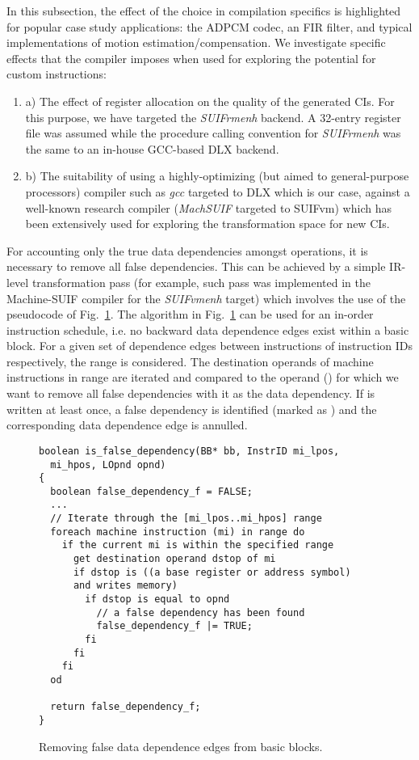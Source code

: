 \documentclass{comjnl}
\begin{document}
In this subsection, the effect of the choice in compilation specifics is highlighted for popular case study applications: the ADPCM codec, an FIR filter, and typical implementations of motion estimation/compensation. We investigate specific effects that the compiler imposes when used for exploring the potential for custom instructions:
\begin {enumerate}
\item[a)] {The effect of register allocation on the quality of the generated CIs. For this purpose, we have targeted the {\it SUIFrmenh} backend. A 32-entry register file was assumed while the procedure calling convention for {\it SUIFrmenh} was the same to an in-house GCC-based DLX backend.}
\item[b)]	{The suitability of using a highly-optimizing (but aimed to general-purpose processors) compiler such as {\it gcc} targeted to DLX which is our case, against a well-known research compiler ({\it MachSUIF} targeted to SUIFvm) which has been extensively used for exploring the transformation space for new CIs.}
\end{enumerate}

For accounting only the true data dependencies amongst operations, it is necessary to remove all false dependencies. This can be achieved by a simple IR-level transformation pass (for example, such pass was implemented in the Machine-SUIF compiler for the {\it SUIFvmenh} target) which involves the use of the pseudocode of Fig.~\ref{Fig:4}. The algorithm in Fig.~\ref{Fig:4} can be used for an in-order instruction schedule, i.e. no backward data dependence edges exist within a basic block. For a given set of dependence edges  between instructions  of instruction IDs  respectively, the range  is considered. The destination operands of machine instructions in range are iterated and compared to the operand () for which we want to remove all false dependencies with it as the data dependency. If  is written at least once, a false dependency is identified (marked as ) and the corresponding data dependence edge is annulled.

\begin{figure}[tb]
\centering
{
{\footnotesize
\begin{verbatim}
boolean is_false_dependency(BB* bb, InstrID mi_lpos, 
  mi_hpos, LOpnd opnd)
{
  boolean false_dependency_f = FALSE;
  ...
  // Iterate through the [mi_lpos..mi_hpos] range
  foreach machine instruction (mi) in range do     
    if the current mi is within the specified range
      get destination operand dstop of mi      
      if dstop is ((a base register or address symbol) 
      and writes memory)
        if dstop is equal to opnd
          // a false dependency has been found
          false_dependency_f |= TRUE;
        fi
      fi
    fi
  od
  
  return false_dependency_f;
}
\end{verbatim}
}
}
\vspace{-0.125cm}
\caption{Removing false data dependence edges from basic blocks.}
\label{Fig:4}
\end{figure}
\end{document}
